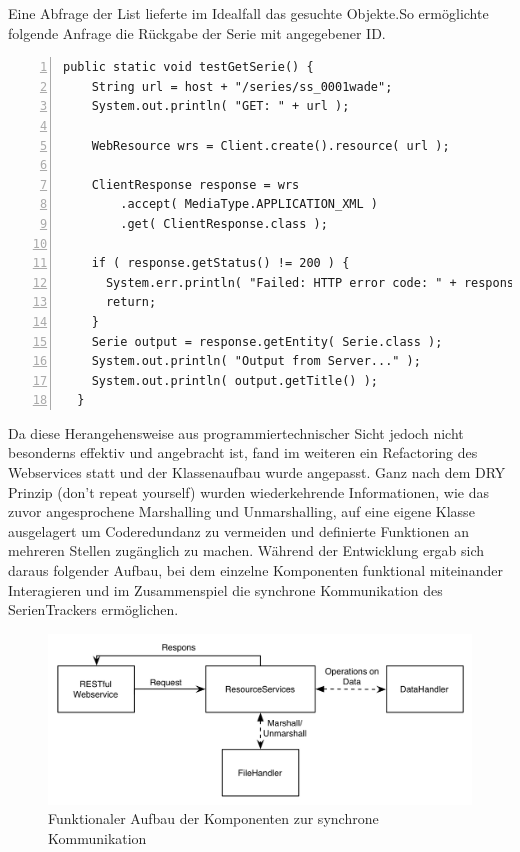 Eine Abfrage der List lieferte im Idealfall das gesuchte Objekte.So ermöglichte folgende Anfrage die Rückgabe der Serie mit angegebener ID.

\begin{lstlisting}[basicstyle=\ttfamily,numbers=left,numberstyle=\footnotesize\ttfamily,backgroundcolor=\color{source},label=testclient,caption= Anfrage des Testclients nach Serie mit angegebener ID]
public static void testGetSerie() {
    String url = host + "/series/ss_0001wade";
    System.out.println( "GET: " + url );

    WebResource wrs = Client.create().resource( url );

    ClientResponse response = wrs
        .accept( MediaType.APPLICATION_XML )
        .get( ClientResponse.class );

    if ( response.getStatus() != 200 ) {
      System.err.println( "Failed: HTTP error code: " + response.getStatus() );
      return;
    }
    Serie output = response.getEntity( Serie.class );
    System.out.println( "Output from Server..." );
    System.out.println( output.getTitle() );
  }
\end{lstlisting}

Da diese Herangehensweise aus programmiertechnischer Sicht jedoch nicht besonderns effektiv und angebracht ist, fand im weiteren ein Refactoring des Webservices statt und der Klassenaufbau wurde angepasst. Ganz nach dem DRY Prinzip (don't repeat yourself) wurden wiederkehrende Informationen, wie das zuvor angesprochene Marshalling und Unmarshalling, auf eine eigene Klasse ausgelagert um Coderedundanz zu vermeiden und definierte Funktionen an mehreren Stellen zugänglich zu machen. Während der Entwicklung ergab sich daraus folgender Aufbau, bei dem einzelne Komponenten funktional miteinander Interagieren und im Zusammenspiel die synchrone Kommunikation des SerienTrackers ermöglichen.

\begin{figure}[h!]
\includegraphics[width=1\textwidth]{../images/aufbaurest.png}
\caption{Funktionaler Aufbau der Komponenten zur synchrone Kommunikation }
\label{RESTaufbau}
\end{figure}

